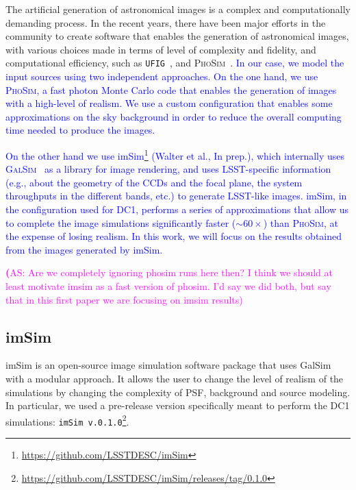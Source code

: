 \documentclass[twocolumn]{aastex62}
\newcommand{\as}[1]{{\textcolor{magenta}{{\textbf (AS: #1)}}}}
\begin{document}
The artificial generation of astronomical images is a complex and computationally demanding process. In the recent
years, there have been major efforts in the community to create software that enables the generation of astronomical images, with various choices made in terms of level of complexity and fidelity, and computational efficiency, such as \texttt{UFIG}~\citep{2016ApJ...817...25B}, and \textsc{PhoSim}~\citep{2015ApJS..218...14P}. \textcolor{blue}{In our case, we model the input sources using
two independent approaches. On the one hand, we use \textsc{PhoSim}, a fast photon Monte Carlo code that enables the generation of images with a high-level of realism. We use a custom configuration that enables some
approximations on the sky background in order to reduce the overall computing time needed to produce the images.}

\textcolor{blue}{On the other hand we use imSim\footnote{\url{https://github.com/LSSTDESC/imSim}} (Walter et al., In prep.), which internally uses \textsc{GalSim}~\citep{2015A&C....10..121R} as a library for image rendering, and uses LSST-specific information (e.g., about the geometry of the CCDs and the focal plane, the system throughputs in the different bands, etc.) to generate LSST-like images. imSim, in the configuration used for DC1, performs a series of approximations that allow us to complete the image simulations significantly faster ($\sim 60\times$) than \textsc{PhoSim}, at the expense of losing realism. In this work, we will focus on the results obtained from the images generated by imSim.}

\as{Are we completely ignoring phosim runs here then? I think we should at least motivate imsim as a fast version of phosim. I'd say we did both, but say that in this first paper we are focusing on imsim results}


\subsection{imSim}
\label{sec:imsim_pipeline}

imSim is an open-source image simulation software package that uses GalSim with a modular approach. It allows the user to change the level of realism of the simulations by changing the complexity of PSF, background and source modeling. In particular, we used a pre-release version specifically meant to perform the DC1 simulations: \texttt{imSim v.0.1.0}\footnote{\url{https://github.com/LSSTDESC/imSim/releases/tag/0.1.0}}.
\end{document}

